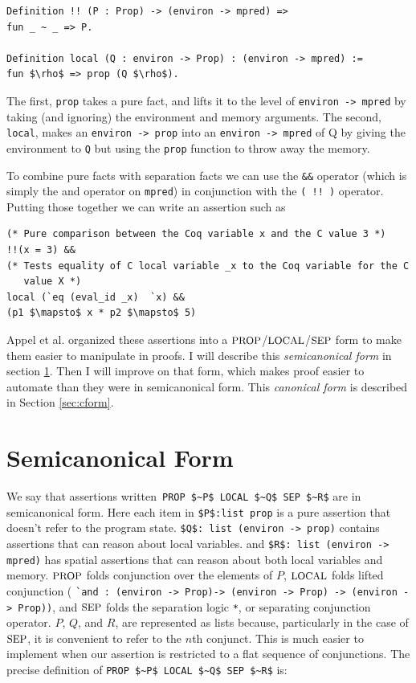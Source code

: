 \documentclass{puthesis}
\begin{document}
\begin{lstlisting}
Definition !! (P : Prop) -> (environ -> mpred) => 
fun _ ~ _ => P.

Definition local (Q : environ -> Prop) : (environ -> mpred) :=
fun $\rho$ => prop (Q $\rho$).
\end{lstlisting}

The first, \lstinline|prop| takes a pure fact, and lifts it to the level of
\lstinline|environ -> mpred| by taking (and ignoring) the environment
and memory arguments. The second, \lstinline|local|, makes an
\lstinline|environ -> prop| into an \lstinline|environ -> mpred| of Q
by giving the environment to \lstinline|Q| but using the 
\lstinline|prop| function to throw away the memory. 

To combine pure facts with separation facts we can use the
\lstinline|&&| operator (which is simply the and operator on
\lstinline|mpred|) in conjunction with the \lstinline|( !! )|
operator. Putting those together we can write an assertion
such as

\begin{lstlisting}
(* Pure comparison between the Coq variable x and the C value 3 *)
!!(x = 3) &&
(* Tests equality of C local variable _x to the Coq variable for the C
   value X *)
local (`eq (eval_id _x)  `x) && 
(p1 $\mapsto$ x * p2 $\mapsto$ 5)
\end{lstlisting}

Appel et al. \cite{appel14:plcc} organized these assertions into a
$\mbox{\small PROP}$/$\mbox{\small LOCAL}$/$\mbox{\small SEP}$ form to make them easier to manipulate in
proofs. I will describe this \emph{semicanonical form} in section
\ref{sec:scform}. Then I will improve on that form, which makes proof
easier to automate than they were in semicanonical form. This
\emph{canonical form} is described in Section \ref{sec:cform}.

\section{Semicanonical Form}
\label{sec:scform}
We say that assertions written~\lstinline{PROP $~P$ LOCAL $~Q$ SEP $~R$}  
are in semicanonical form. Here each item in
\lstinline|$P$:list prop| is a pure assertion that doesn't refer to
the program state. \lstinline|$Q$: list (environ -> prop)| contains
assertions that can reason about local variables.  and 
\lstinline|$R$: list (environ -> mpred)| has spatial assertions that can reason about
both local variables and memory.  $\mbox{\small PROP}$ folds conjunction over the
elements of $P$, $\mbox{\small LOCAL}$ folds lifted conjunction ( 
\lstinline|`and : (environ -> Prop)-> (environ -> Prop) -> (environ -> Prop))|, and
$\mbox{\small SEP}$ folds the separation logic \lstinline|*|, or separating
conjunction operator. $P$, $Q$, and $R$, are represented as lists
because, particularly in the case of $\mbox{\small SEP}$, it is convenient to refer
to the $n$th conjunct. This is much easier to implement when our
assertion is restricted to a flat sequence of conjunctions. The
precise definition of \lstinline{PROP $~P$ LOCAL $~Q$ SEP $~R$} is:
\end{document}
